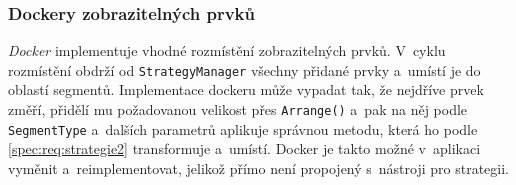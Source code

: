 \subsubsection*{Dockery zobrazitelných prvků}
\textit{Docker} implementuje vhodné rozmístění zobrazitelných prvků. V~cyklu rozmístění obdrží od \texttt{StrategyManager} všechny přidané prvky a~umístí je do oblastí segmentů. Implementace dockeru může vypadat tak, že nejdříve prvek změří, přidělí mu požadovanou velikost přes \texttt{Arrange()} a~pak na něj podle \texttt{SegmentType} a~dalších parametrů aplikuje správnou metodu, která ho podle \ref{spec:req:strategie2} transformuje a~umístí. Docker je takto možné v~aplikaci vyměnit a~reimplementovat, jelikož přímo není propojený s~nástroji pro strategii.